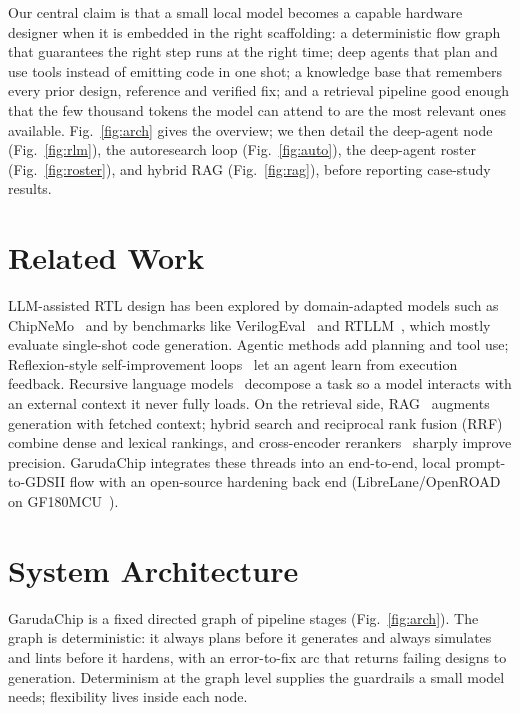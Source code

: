 \documentclass[conference]{IEEEtran}
\begin{document}
Our central claim is that a small local model becomes a capable hardware designer
when it is embedded in the right scaffolding: a deterministic flow graph that
guarantees the right step runs at the right time; deep agents that plan and use
tools instead of emitting code in one shot; a knowledge base that remembers every
prior design, reference and verified fix; and a retrieval pipeline good enough
that the few thousand tokens the model can attend to are the most relevant ones
available. Fig.~\ref{fig:arch} gives the overview; we then detail the deep-agent
node (Fig.~\ref{fig:rlm}), the autoresearch loop (Fig.~\ref{fig:auto}), the
deep-agent roster (Fig.~\ref{fig:roster}), and hybrid RAG (Fig.~\ref{fig:rag}),
before reporting case-study results.

\section{Related Work}
LLM-assisted RTL design has been explored by domain-adapted models such as
ChipNeMo~\cite{chipnemo} and by benchmarks like VerilogEval~\cite{verilogeval}
and RTLLM~\cite{rtllm}, which mostly evaluate single-shot code generation.
Agentic methods add planning and tool use; Reflexion-style self-improvement
loops~\cite{reflexion} let an agent learn from execution feedback. Recursive
language models~\cite{rlm} decompose a task so a model interacts with an external
context it never fully loads. On the retrieval side, RAG~\cite{rag} augments
generation with fetched context; hybrid search and reciprocal rank fusion
(RRF)~\cite{rrf} combine dense and lexical rankings, and cross-encoder
rerankers~\cite{sbert} sharply improve precision. GarudaChip integrates these
threads into an end-to-end, local prompt-to-GDSII flow with an open-source
hardening back end (LibreLane/OpenROAD~\cite{openroad,librelane} on
GF180MCU~\cite{gf180}).

\section{System Architecture}
GarudaChip is a fixed directed graph of pipeline stages (Fig.~\ref{fig:arch}).
The graph is deterministic: it always plans before it generates and always
simulates and lints before it hardens, with an error-to-fix arc that returns
failing designs to generation. Determinism at the graph level supplies the
guardrails a small model needs; flexibility lives inside each node.
\end{document}
